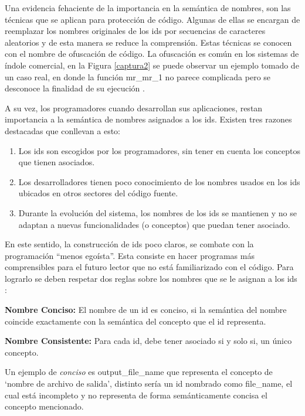 Una evidencia fehaciente de la importancia en la semántica de nombres, son las técnicas que se aplican para protección de código. Algunas de ellas se encargan de reemplazar los nombres originales de los ids por secuencias de caracteres aleatorios y de esta manera se reduce la comprensión. Estas técnicas se conocen con el nombre de ofuscación de código. La ofuscación es común en los sistemas de índole comercial, en la Figura \ref{captura2} se puede observar un ejemplo tomado de un caso real, en donde la función \textsf{mr\_mr\_1} no parece complicada pero se desconoce la finalidad de su ejecución \cite{DFPM05}.

A su vez, los programadores cuando desarrollan sus aplicaciones, restan importancia a la semántica de nombres asignados a los ids. Existen tres razones destacadas que conllevan a esto:

\begin{enumerate}
\itemsep0em%
\item Los ids son escogidos por los programadores, sin tener en cuenta los conceptos que tienen asociados.

\item Los desarrolladores tienen poco conocimiento de los nombres usados en los ids ubicados en otros sectores del código fuente.

\item Durante la evolución del sistema, los nombres de los ids se mantienen y no se adaptan a nuevas funcionalidades (o conceptos) que puedan tener asociado.
\end{enumerate}

En este sentido, la construcción de ids poco claros, se combate con la programación “menos egoísta”. Esta consiste en hacer programas más comprensibles para el futuro lector que no está familiarizado con el código. Para lograrlo se deben respetar dos reglas sobre los nombres que se le asignan a los ids \cite{DFPM05,DLHD06}:

\begin{framed}
\noindent \textbf{Nombre Conciso:} El nombre de un id es conciso, si la semántica del nombre coincide exactamente con la semántica del concepto que el id representa.

\noindent \textbf{Nombre Consistente:} Para cada id, debe tener asociado si y solo si, un único concepto.
\end{framed}

Un ejemplo de \textit{conciso} es \textsf{output\_file\_name} que representa el concepto de `nombre de archivo de salida', distinto sería un id nombrado como \textsf{file\_name}, el cual está incompleto y no representa de forma semánticamente concisa el concepto mencionado.


